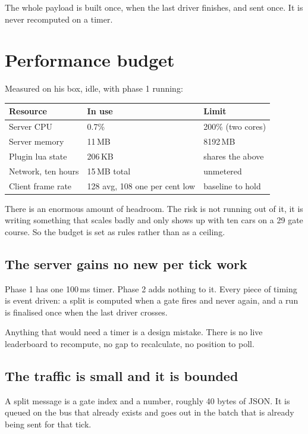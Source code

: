 \documentclass[11pt,a4paper]{article}
\begin{document}
The whole payload is built once, when the last driver finishes, and sent once.
It is never recomputed on a timer.

\section{Performance budget}

Measured on his box, idle, with phase 1 running:

\begin{longtable}{@{}lll@{}}
\toprule
\textbf{Resource} & \textbf{In use} & \textbf{Limit} \\
\midrule
\endhead
Server CPU        & 0.7\%   & 200\% (two cores) \\
Server memory     & 11\,MB  & 8192\,MB \\
Plugin lua state  & 206\,KB & shares the above \\
Network, ten hours& 15\,MB total & unmetered \\
Client frame rate & 128 avg, 108 one per cent low & baseline to hold \\
\bottomrule
\end{longtable}

There is an enormous amount of headroom. The risk is not running out of it, it
is writing something that scales badly and only shows up with ten cars on a 29
gate course. So the budget is set as rules rather than as a ceiling.

\subsection*{The server gains no new per tick work}

Phase 1 has one 100\,ms timer. Phase 2 adds nothing to it. Every piece of
timing is event driven: a split is computed when a gate fires and never again,
and a run is finalised once when the last driver crosses.

Anything that would need a timer is a design mistake. There is no live
leaderboard to recompute, no gap to recalculate, no position to poll.

\subsection*{The traffic is small and it is bounded}

A split message is a gate index and a number, roughly 40 bytes of JSON. It is
queued on the bus that already exists and goes out in the batch that is already
being sent for that tick.
\end{document}
